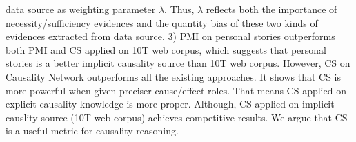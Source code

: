 {data source as weighting parameter $\lambda$.
Thus, $\lambda$ reflects both the importance of necessity/sufficiency evidences 
and the quantity bias of these two kinds of evidences extracted from data source.
3) PMI on personal stories outperforms both PMI and CS applied on 10T web corpus, 
which suggests that personal stories is a better implicit causality source than 10T web corpus.
However, CS on Causality Network outperforms all the existing approaches. 
It shows that CS is more powerful when given preciser cause/effect roles. 
That means CS applied on explicit causality knowledge is more proper. 
Although, CS applied on implicit causlity source (10T web corpus) achieves competitive results.
We argue that CS is a useful metric for causality reasoning.
}%






